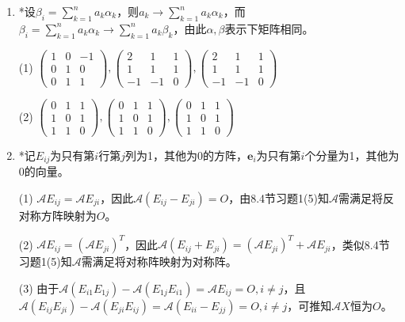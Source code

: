 \documentclass[a4paper,UTF8,fontset=windows]{ctexart}
\begin{document}
\begin{enumerate}
(10) $\begin{pmatrix}0&0&1&0\\0&0&0&2\\-1&0&0&0\\0&-2&0&0\end{pmatrix}$

\item
*设$\beta_i=\sum_{k=1}^na_k\alpha_k$，则$a_k\to\sum_{k=1}^na_k\alpha_k$，而$\beta_i=\sum_{k=1}^na_k\alpha_k\to\sum_{k=1}^na_k\beta_k$，由此$\alpha,\beta$表示下矩阵相同。

(1) $\begin{pmatrix}1&0&-1\\0&1&0\\0&1&1\end{pmatrix},\begin{pmatrix}2&1&1\\1&1&1\\-1&-1&0\end{pmatrix},\begin{pmatrix}2&1&1\\1&1&1\\-1&-1&0\end{pmatrix}$

(2) $\begin{pmatrix}0&1&1\\1&0&1\\1&1&0\end{pmatrix},\begin{pmatrix}0&1&1\\1&0&1\\1&1&0\end{pmatrix},\begin{pmatrix}0&1&1\\1&0&1\\1&1&0\end{pmatrix}$

\item
*记$E_{ij}$为只有第$i$行第$j$列为1，其他为0的方阵，$\mathbf{e}_i$为只有第$i$个分量为1，其他为0的向量。

(1) $\mathcal{A}E_{ij}=\mathcal{A}E_{ji}$，因此$\mathcal{A}(E_{ij}-E_{ji})=O$，由8.4节习题1(5)知$\mathcal{A}$需满足将反对称方阵映射为$O$。

(2) $\mathcal{A}E_{ij}=(\mathcal{A}E_{ji})^T$，因此$\mathcal{A}(E_{ij}+E_{ji})=(\mathcal{A}E_{ji})^T+\mathcal{A}E_{ji}$，类似8.4节习题1(5)知$\mathcal{A}$需满足将对称阵映射为对称阵。

(3) 由于$\mathcal{A}(E_{i1}E_{1j})-\mathcal{A}(E_{1j}E_{i1})=\mathcal{A}E_{ij}=O,i\ne j$，且$\mathcal{A}(E_{ij}E_{ji})-\mathcal{A}(E_{ji}E_{ij})=\mathcal{A}(E_{ii}-E_{jj})=O,i\ne j$，可推知$\mathcal{A}X$恒为$O$。


\end{enumerate}
\end{document}
